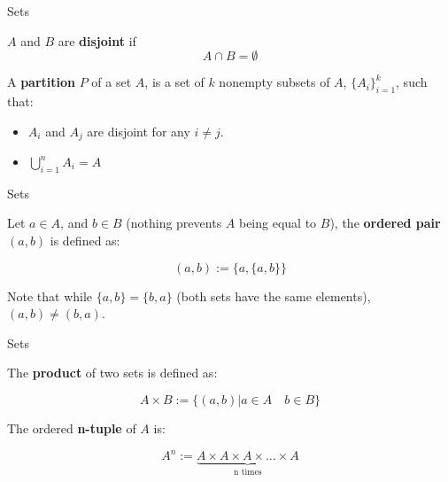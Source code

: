 \documentclass[aspectratio=169, handout]{beamer}
\begin{document}
\begin{frame}{Sets}
    \begin{definition}
    $A$ and $B$ are \textbf{disjoint} if $$A\cap B=\emptyset$$
    \end{definition}
    
    \begin{definition}
    
    A \textbf{partition} $P$ of a set $A$, is a set of $k$ nonempty subsets of $A$, $\{A_i\}_{i=1}^{k}$, such that:
    
    \begin{itemize}
        \item $A_i$ and $A_j$ are disjoint for any $i\neq j$.
        \item $\bigcup_{i=1}^{n}A_i=A$
    \end{itemize}
    
    
    \end{definition}
    
\end{frame}
\begin{frame}{Sets}
    \begin{definition}
    Let $a\in A$, and $b\in B$ (nothing prevents $A$ being equal to $B$), the \textbf{ordered pair} $(a,b)$ is defined as:
    
    $$(a,b):=\{a,\{a,b\}\}$$
    
    \end{definition}
    
    Note that while $\{a,b\}=\{b,a\}$ (both sets have the same elements), $(a,b)\neq(b,a)$.
\end{frame}

\begin{frame}{Sets}
    \begin{definition}
    The \textbf{product} of two sets is defined as:
    
    $$A\times B:=\{(a,b)| a\in A\quad b\in B\}$$
    \end{definition}
    
    \begin{definition}
        The ordered \textbf{n-tuple} of $A$ is:
        
        $$A^n := \underbrace{A\times A\times A \times\ldots\times A}_{\text{n times}}$$
    \end{definition}
\end{frame}
\end{document}
